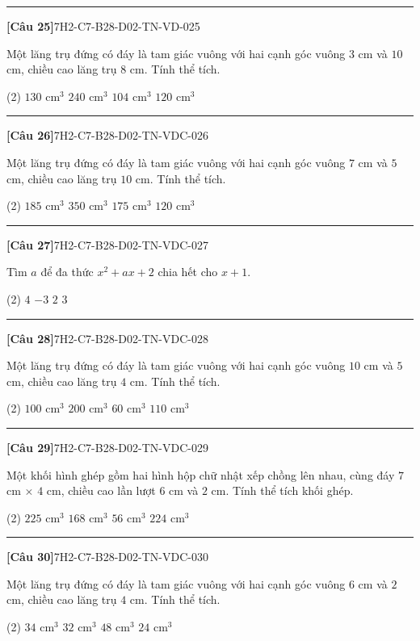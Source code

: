 \documentclass[12pt,a4paper]{article}
\newif\ifloigiai
\newenvironment{cauhoi}[2]{%
  \par\medskip\noindent\rule{\textwidth}{0.4pt}\par\nopagebreak
  \noindent\textbf{[#1]}\hfill{\scriptsize\ttfamily #2}\par\nopagebreak\smallskip}{\par}
\newcommand{\dapan}[1]{\ifloigiai\par\smallskip\noindent\textit{Đáp án:} \textbf{#1}\par\fi}
\begin{document}
\begin{cauhoi}{Câu 25}{7H2-C7-B28-D02-TN-VD-025}
Một lăng trụ đứng có đáy là tam giác vuông với hai cạnh góc vuông $3$ cm và $10$ cm, chiều cao lăng trụ $8$ cm. Tính thể tích.
\begin{tasks}(2)
\task $130\text{ cm}^3$
\task $240\text{ cm}^3$
\task $104\text{ cm}^3$
\task $120\text{ cm}^3$
\end{tasks}
\dapan{D}
\end{cauhoi}
\begin{cauhoi}{Câu 26}{7H2-C7-B28-D02-TN-VDC-026}
Một lăng trụ đứng có đáy là tam giác vuông với hai cạnh góc vuông $7$ cm và $5$ cm, chiều cao lăng trụ $10$ cm. Tính thể tích.
\begin{tasks}(2)
\task $185\text{ cm}^3$
\task $350\text{ cm}^3$
\task $175\text{ cm}^3$
\task $120\text{ cm}^3$
\end{tasks}
\dapan{C}
\end{cauhoi}
\begin{cauhoi}{Câu 27}{7H2-C7-B28-D02-TN-VDC-027}
Tìm $a$ để đa thức $x^{2}+ax+2$ chia hết cho $x+1$.
\begin{tasks}(2)
\task $4$
\task $-3$
\task $2$
\task $3$
\end{tasks}
\dapan{D}
\end{cauhoi}
\begin{cauhoi}{Câu 28}{7H2-C7-B28-D02-TN-VDC-028}
Một lăng trụ đứng có đáy là tam giác vuông với hai cạnh góc vuông $10$ cm và $5$ cm, chiều cao lăng trụ $4$ cm. Tính thể tích.
\begin{tasks}(2)
\task $100\text{ cm}^3$
\task $200\text{ cm}^3$
\task $60\text{ cm}^3$
\task $110\text{ cm}^3$
\end{tasks}
\dapan{A}
\end{cauhoi}
\begin{cauhoi}{Câu 29}{7H2-C7-B28-D02-TN-VDC-029}
Một khối hình ghép gồm hai hình hộp chữ nhật xếp chồng lên nhau, cùng đáy $7$ cm $\times$ $4$ cm, chiều cao lần lượt $6$ cm và $2$ cm. Tính thể tích khối ghép.
\begin{tasks}(2)
\task $225\text{ cm}^3$
\task $168\text{ cm}^3$
\task $56\text{ cm}^3$
\task $224\text{ cm}^3$
\end{tasks}
\dapan{D}
\end{cauhoi}
\begin{cauhoi}{Câu 30}{7H2-C7-B28-D02-TN-VDC-030}
Một lăng trụ đứng có đáy là tam giác vuông với hai cạnh góc vuông $6$ cm và $2$ cm, chiều cao lăng trụ $4$ cm. Tính thể tích.
\begin{tasks}(2)
\task $34\text{ cm}^3$
\task $32\text{ cm}^3$
\task $48\text{ cm}^3$
\task $24\text{ cm}^3$
\end{tasks}
\dapan{D}
\end{cauhoi}
\end{document}
